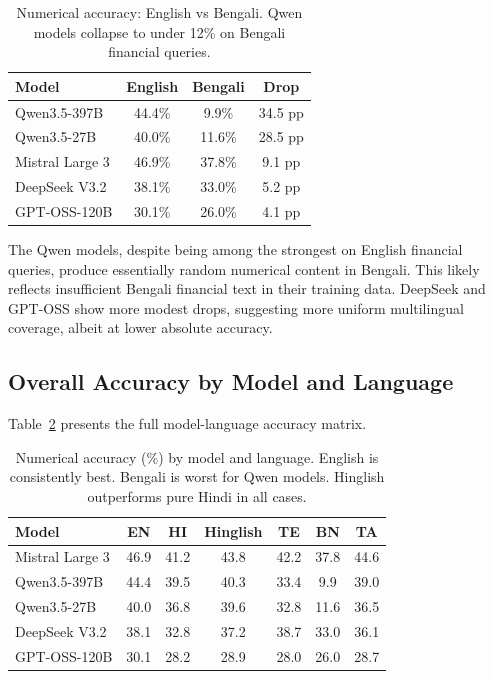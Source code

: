 \begin{table}[h]
\centering
\begin{tabular}{lccc}
\toprule
Model & English & Bengali & Drop \\
\midrule
Qwen3.5-397B & 44.4\% & 9.9\% & 34.5 pp \\
Qwen3.5-27B & 40.0\% & 11.6\% & 28.5 pp \\
Mistral Large 3 & 46.9\% & 37.8\% & 9.1 pp \\
DeepSeek V3.2 & 38.1\% & 33.0\% & 5.2 pp \\
GPT-OSS-120B & 30.1\% & 26.0\% & 4.1 pp \\
\bottomrule
\end{tabular}
\caption{Numerical accuracy: English vs Bengali. Qwen models collapse to under 12\% on Bengali financial queries.}
\label{tab:bengali}
\end{table}

The Qwen models, despite being among the strongest on English financial queries, produce essentially random numerical content in Bengali. This likely reflects insufficient Bengali financial text in their training data. DeepSeek and GPT-OSS show more modest drops, suggesting more uniform multilingual coverage, albeit at lower absolute accuracy.

\subsection{Overall Accuracy by Model and Language}

Table~\ref{tab:model_lang} presents the full model-language accuracy matrix.

\begin{table}[h]
\centering
\small
\begin{tabular}{lcccccc}
\toprule
Model & EN & HI & Hinglish & TE & BN & TA \\
\midrule
Mistral Large 3 & 46.9 & 41.2 & 43.8 & 42.2 & 37.8 & 44.6 \\
Qwen3.5-397B & 44.4 & 39.5 & 40.3 & 33.4 & 9.9 & 39.0 \\
Qwen3.5-27B & 40.0 & 36.8 & 39.6 & 32.8 & 11.6 & 36.5 \\
DeepSeek V3.2 & 38.1 & 32.8 & 37.2 & 38.7 & 33.0 & 36.1 \\
GPT-OSS-120B & 30.1 & 28.2 & 28.9 & 28.0 & 26.0 & 28.7 \\
\bottomrule
\end{tabular}
\caption{Numerical accuracy (\%) by model and language. English is consistently best. Bengali is worst for Qwen models. Hinglish outperforms pure Hindi in all cases.}
\label{tab:model_lang}
\end{table}

